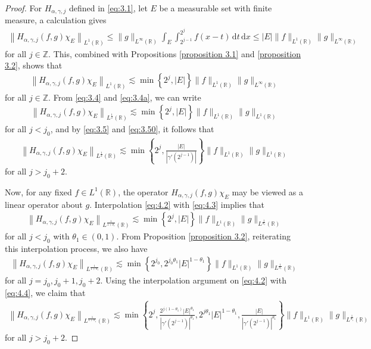 \documentclass[11pt, twoside, leqno]{article}
\theoremstyle{definition}
\numberwithin{equation}{section}
\begin{document}
\begin{proof}
For $H_{\alpha,\gamma,j}$ defined in \eqref{eq:3.1}, let $E$ be a measurable set with finite measure, a calculation gives
\begin{align*}
 \left \|H_{\alpha,\gamma,j}(f,g)\chi_{E}\right\|_{L^{1}(\mathbb{R})}
  \leq\|g\|_{L^{\infty}(\mathbb{R})}\int_{E}\int_{2^{j-1}}^{2^j}f(x-t)\,\textrm{d}t\,\textrm{d}x
  \leq|E|\|f\|_{L^{1}(\mathbb{R})}\|g\|_{L^{\infty}(\mathbb{R})}
 \end{align*}
for all $j\in \mathbb{Z}$. This, combined with Propositions \ref{proposition 3.1} and \ref{proposition 3.2}, shows that
  \begin{align}\label{eq:4.2}
  \left\|H_{\alpha,\gamma,j}(f,g)\chi_{E}\right\|_{L^{1}(\mathbb{R})}\lesssim \min\left\{2^j,|E|\right\}\|f\|_{L^{1}(\mathbb{R})}\|g\|_{L^{\infty}(\mathbb{R})}
  \end{align}
for all $j\in \mathbb{Z}$. From \eqref{eq:3.4} and \eqref{eq:3.4a}, we can write
  \begin{align}\label{eq:4.3}
  \left\|H_{\alpha,\gamma,j}(f,g)\chi_{E}\right\|_{L^{\frac{1}{2}}(\mathbb{R})}\lesssim \min\left\{2^j,|E|\right\}\|f\|_{L^{1}(\mathbb{R})}\|g\|_{L^{1}(\mathbb{R})}
  \end{align}
  for all $j<j_0$, and by \eqref{eq:3.5} and \eqref{eq:3.50}, it follows that
   \begin{align}\label{eq:4.4}
  \left\|H_{\alpha,\gamma,j}(f,g)\chi_{E}\right\|_{L^{\frac{1}{2}}(\mathbb{R})}\lesssim \min\left\{2^j,\frac{|E|}{|\gamma'(2^{j-1})|}\right\}\|f\|_{L^{1}(\mathbb{R})}\|g\|_{L^{1}(\mathbb{R})}
  \end{align}
 for all $j>j_0+2$.

Now, for any fixed $f\in L^1(\mathbb{R})$, the operator $H_{\alpha,\gamma,j}(f,g)\chi_{E}$ may be viewed as a linear operator about $g$. Interpolation \eqref{eq:4.2} with \eqref{eq:4.3} implies that
 \begin{align}\label{eq:4.5}
  \left\|H_{\alpha,\gamma,j}(f,g)\chi_{E}\right\|_{L^{\frac{1}{1+\theta_1}}(\mathbb{R})}\lesssim \min\left\{2^j,|E|\right\}\|f\|_{L^{1}(\mathbb{R})}\|g\|_{L^{\frac{1}{\theta_1}}(\mathbb{R})}
  \end{align}
for all $j<j_0$ with $\theta_1\in (0,1)$. From Proposition \ref{proposition 3.2}, reiterating this interpolation process, we also have
\begin{align}\label{eq:4.7}
  \left\|H_{\alpha,\gamma,j}(f,g)\chi_{E}\right\|_{L^{\frac{1}{1+\theta_1}}(\mathbb{R})}\lesssim \min\left\{2^{j_0},2^{{j_0}\theta_{1}}|E|^{1-\theta_{1}}\right\}\|f\|_{L^{1}(\mathbb{R})}\|g\|_{L^{\frac{1}{\theta_1}}(\mathbb{R})}
  \end{align}
for all $j=j_0, j_0+1, j_0+2$. Using the interpolation argument on \eqref{eq:4.2} with \eqref{eq:4.4}, we claim that
\begin{align}\label{eq:4.6}
  \left\|H_{\alpha,\gamma,j}(f,g)\chi_{E}\right\|_{L^{\frac{1}{1+\theta_1}}(\mathbb{R})}\lesssim \min\left\{2^j,\frac{2^{j(1-\theta_{1})}|E|^{\theta_1}}{|\gamma'(2^{j-1})|^{\theta_{1}}},2^{j\theta_1} |E|^{1-\theta_1},\frac{|E|}{|\gamma'(2^{j-1})|^{\theta_1}}\right\}\|f\|_{L^{1}(\mathbb{R})}\|g\|_{L^{\frac{1}{\theta_1}}(\mathbb{R})}
  \end{align}
for all $j>j_0+2$.


\end{proof}
\end{document}
